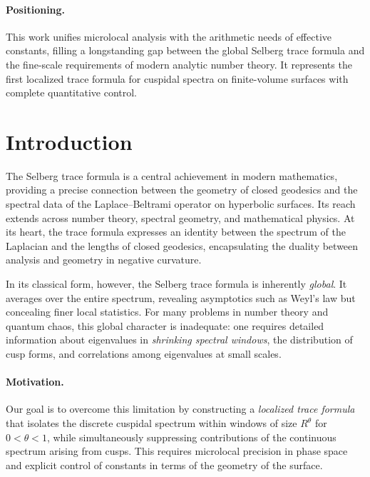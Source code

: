 \paragraph{Positioning.}
This work unifies microlocal analysis with the arithmetic needs of effective constants,
filling a longstanding gap between the global Selberg trace formula and the fine-scale
requirements of modern analytic number theory.  
It represents the first localized trace formula for cuspidal spectra on finite-volume
surfaces with complete quantitative control.

\section{Introduction}\label{sec:intro}

The Selberg trace formula is a central achievement in modern mathematics, providing a
precise connection between the geometry of closed geodesics and the spectral data of the
Laplace--Beltrami operator on hyperbolic surfaces.  
Its reach extends across number theory, spectral geometry, and mathematical physics.
At its heart, the trace formula expresses an identity between the spectrum of the Laplacian
and the lengths of closed geodesics, encapsulating the duality between analysis and
geometry in negative curvature.

In its classical form, however, the Selberg trace formula is inherently \emph{global}.
It averages over the entire spectrum, revealing asymptotics such as Weyl’s law but
concealing finer local statistics.  
For many problems in number theory and quantum chaos, this global character is inadequate:
one requires detailed information about eigenvalues in \emph{shrinking spectral windows},
the distribution of cusp forms, and correlations among eigenvalues at small scales.

\paragraph{Motivation.}
Our goal is to overcome this limitation by constructing a \emph{localized trace formula}
that isolates the discrete cuspidal spectrum within windows of size $R^\theta$
for $0<\theta<1$, while simultaneously suppressing contributions of the continuous
spectrum arising from cusps.  
This requires microlocal precision in phase space and explicit control of constants in
terms of the geometry of the surface.

